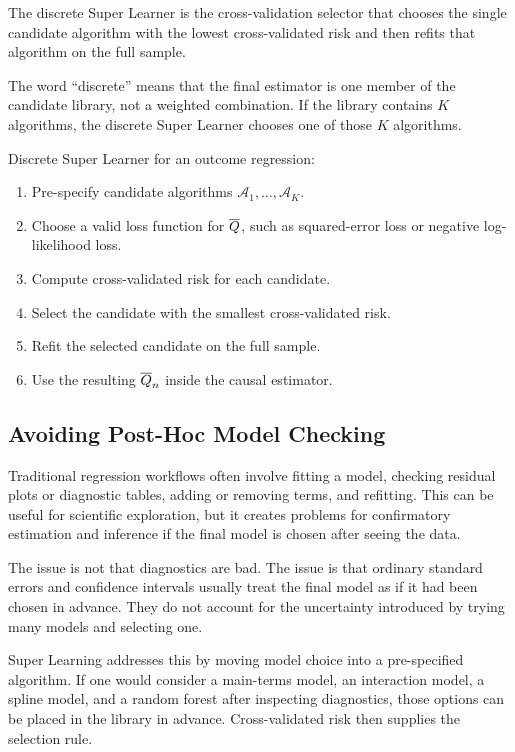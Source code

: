 \begin{definition}
The discrete Super Learner is the cross-validation selector that chooses the single
candidate algorithm with the lowest cross-validated risk and then refits that algorithm
on the full sample.
\end{definition}

The word ``discrete'' means that the final estimator is one member of the candidate
library, not a weighted combination. If the library contains $K$ algorithms, the
discrete Super Learner chooses one of those $K$ algorithms.

\begin{estimationbox}
Discrete Super Learner for an outcome regression:
\begin{enumerate}
\item Pre-specify candidate algorithms $\mathcal A_1,\ldots,\mathcal A_K$.
\item Choose a valid loss function for $\overline{Q}$, such as squared-error loss or
negative log-likelihood loss.
\item Compute cross-validated risk for each candidate.
\item Select the candidate with the smallest cross-validated risk.
\item Refit the selected candidate on the full sample.
\item Use the resulting $\overline{Q}_n$ inside the causal estimator.
\end{enumerate}
\end{estimationbox}

\subsection{Avoiding Post-Hoc Model Checking}

Traditional regression workflows often involve fitting a model, checking residual
plots or diagnostic tables, adding or removing terms, and refitting. This can be useful
for scientific exploration, but it creates problems for confirmatory estimation and
inference if the final model is chosen after seeing the data.

The issue is not that diagnostics are bad. The issue is that ordinary standard errors
and confidence intervals usually treat the final model as if it had been chosen in
advance. They do not account for the uncertainty introduced by trying many models
and selecting one.

Super Learning addresses this by moving model choice into a pre-specified algorithm.
If one would consider a main-terms model, an interaction model, a spline model, and a
random forest after inspecting diagnostics, those options can be placed in the library
in advance. Cross-validated risk then supplies the selection rule.

